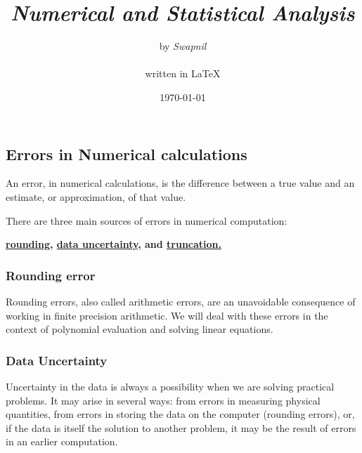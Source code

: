 \documentclass[11pt, a4paper, oneside]{book}
\title{\Huge{\emph{Numerical and Statistical Analysis}}}
\author{\huge{by \emph{Swapnil}}\\ \\ \Large{written in {\LaTeX}}}
\date{\today}
\begin{document}
      \maketitle
      \thispagestyle{empty}
      \newpage

      \setcounter{tocdepth}{3}
      \tableofcontents



      \chapter{}
        \section{Errors in Numerical calculations}
          An error, in numerical calculations, is the difference between a true value and
          an estimate, or approximation, of that value.

          There are three main sources of errors in numerical computation:

          \textbf{\underline{rounding}, \underline{data uncertainty}, and
          \underline{truncation.}}

          \subsection{Rounding error}
            Rounding errors, also called arithmetic errors, are an unavoidable consequence of
            working in finite precision arithmetic. We will deal with these errors in the context
            of polynomial evaluation and solving linear equations.

          \subsection{Data Uncertainty}
            Uncertainty in the data is always a possibility when we are solving practical problems.
            It may arise in several ways: from errors in measuring physical quantities, from errors
            in storing the data on the computer (rounding errors), or, if the data is itself the
            solution to another problem, it may be the result of errors in an earlier computation.
\end{document}
